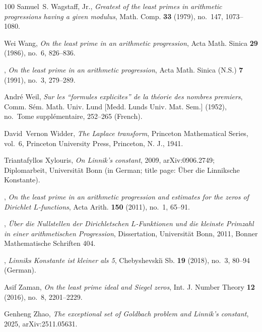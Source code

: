 \documentclass[11pt]{amsart}
\numberwithin{equation}{section}
\theoremstyle{plain}
\theoremstyle{definition}
\theoremstyle{remark}
\newcommand{\1}{\mathbf{1}}
\begin{document}
\begin{thebibliography}{100}
Samuel~S. Wagstaff, Jr., \emph{Greatest of the least primes in arithmetic
  progressions having a given modulus}, Math. Comp. \textbf{33} (1979),
  no.~147, 1073--1080.

Wei Wang, \emph{On the least prime in an arithmetic progression}, Acta Math.
  Sinica \textbf{29} (1986), no.~6, 826--836. 

\bysame, \emph{On the least prime in an arithmetic progression}, Acta Math.
  Sinica (N.S.) \textbf{7} (1991), no.~3, 279--289.

Andr{\'e} Weil, \emph{Sur les ``formules explicites'' de la th{\'e}orie des
  nombres premiers}, Comm. S{\'e}m. Math. Univ. Lund [Medd. Lunds Univ. Mat.
  Sem.] (1952), no.~Tome suppl{\'e}mentaire, 252--265 (French). 

David~Vernon Widder, \emph{The {L}aplace transform}, Princeton Mathematical
  Series, vol.~6, Princeton University Press, Princeton, N. J., 1941.

Triantafyllos Xylouris, \emph{On {L}innik's constant}, 2009, arXiv:0906.2749;
  Diplomarbeit, Universit{\"a}t Bonn (in German; title page: {\"U}ber die
  {L}innik{s}che {K}onstante).

\bysame, \emph{On the least prime in an arithmetic progression and estimates
  for the zeros of {D}irichlet {$L$}-functions}, Acta Arith. \textbf{150}
  (2011), no.~1, 65--91.

\bysame, \emph{{\"U}ber die {N}ullstellen der {D}irichletschen
  {$L$}-{F}unktionen und die kleinste {P}rimzahl in einer arithmetischen
  {P}rogression}, Dissertation, Universit{\"a}t Bonn, 2011, Bonner
  Mathematische Schriften 404.

\bysame, \emph{Linniks {K}onstante ist kleiner als 5}, Chebyshevski{\u\i} Sb.
  \textbf{19} (2018), no.~3, 80--94 (German).

Asif Zaman, \emph{On the least prime ideal and {S}iegel zeros}, Int. J. Number
  Theory \textbf{12} (2016), no.~8, 2201--2229.

Genheng Zhao, \emph{The exceptional set of {G}oldbach problem and {L}innik's
  constant}, 2025, arXiv:2511.05631.

\end{thebibliography}
\end{document}
